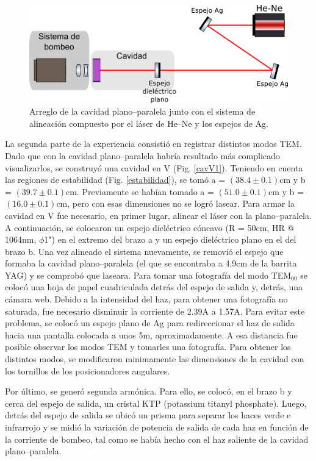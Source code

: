 \documentclass[10pt, a4paper]{article}%
\begin{document}
\begin{multicols}{2}
\begin{figure}[H]
    \centering
    \includegraphics[scale=0.5]{Graficos/cavplana.png}
    \caption{Arreglo de la cavidad plano--paralela junto con el sistema de alineación compuesto por el láser de He--Ne y los espejos de Ag.}
    \label{cavplana}
\end{figure}

La segunda parte de la experiencia consistió en registrar distintos modos TEM. Dado que con la cavidad plano--paralela habría resultado más complicado visualizarlos, se construyó una cavidad en V (Fig. \ref{cavV1}). Teniendo en cuenta las regiones de estabilidad (Fig. \ref{estabilidad}), se tomó a = $(38.4 \pm 0.1)$cm y b = $(39.7 \pm 0.1)$cm. Previamente se habían tomado a = $(51.0 \pm 0.1)$cm y b = $(16.0 \pm 0.1)$cm, pero con esas dimensiones no se logró lasear. Para armar la cavidad en V fue necesario, en primer lugar, alinear el láser con la plano--paralela. A continuación, se colocaron un espejo dieléctrico cóncavo  (R = 50cm, HR @ 1064nm, $\phi$1") en el extremo del brazo a y un espejo dieléctrico plano en el del brazo b. Una vez alineado el sistema nuevamente, se removió el espejo que formaba la cavidad plano--paralela (el que se encontraba a 4.9cm de la barrita YAG) y se comprobó que laseara.
Para tomar una fotografía del modo TEM$_{00}$ se colocó una hoja de papel cuadriculada detrás del espejo de salida y, detrás, una cámara web. Debido a la intensidad del haz, para obtener una fotografía no saturada, fue necesario disminuir la corriente de 2.39A a 1.57A. Para evitar este problema, se colocó un espejo plano de Ag para redireccionar el haz de salida hacia una pantalla colocada a unos 5m, aproximadamente. A esa distancia fue posible observar los modos TEM y tomarles una fotografía. Para obtener los distintos modos, se modificaron minimamente las dimensiones de la cavidad con los tornillos de los posicionadores angulares. 





Por último, se generó segunda armónica. Para ello, se colocó, en el brazo b y cerca del espejo de salida, un cristal KTP (potassium titanyl phosphate). Luego, detrás del espejo de salida se ubicó un prisma para separar los haces verde e infrarrojo y se midió la variación de potencia de salida de cada haz en función de la corriente de bombeo, tal como se había hecho con el haz saliente de la cavidad plano--paralela.   








\end{multicols}
\end{document}
